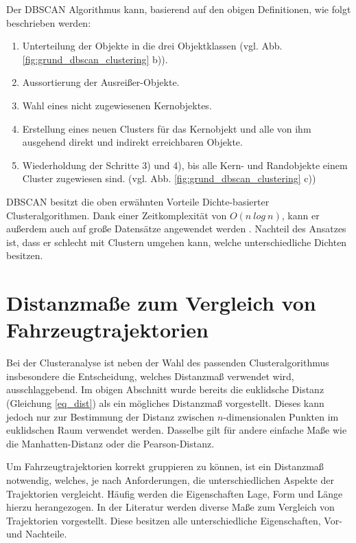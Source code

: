 Der DBSCAN Algorithmus kann, basierend auf den obigen Definitionen, wie folgt beschrieben werden:

\begin{enumerate}
    \item Unterteilung der Objekte in die drei Objektklassen (vgl. Abb. \ref{fig:grund_dbscan_clustering} b)).
    \item Aussortierung der Ausreißer-Objekte.
    \item Wahl eines nicht zugewiesenen Kernobjektes.
    \item Erstellung eines neuen Clusters für das Kernobjekt und alle von ihm ausgehend direkt und indirekt erreichbaren Objekte.
    \item Wiederholdung der Schritte 3) und 4), bis alle Kern- und Randobjekte einem Cluster zugewiesen sind. (vgl. Abb. \ref{fig:grund_dbscan_clustering} c))
\end{enumerate}

DBSCAN besitzt die oben erwähnten Vorteile Dichte-basierter Clusteralgorithmen. Dank einer Zeitkomplexität
von $O(n\ log\ n)$, kann er außerdem auch auf große Datensätze angewendet werden \cite[]{tan2007introduction}.
Nachteil des Ansatzes ist, dass er schlecht mit Clustern umgehen kann, welche unterschiedliche Dichten besitzen.

\section{Distanzmaße zum Vergleich von Fahrzeugtrajektorien}
\label{sec:distance_measures}

Bei der Clusteranalyse ist neben der Wahl des passenden Clusteralgorithmus insbesondere
die Entscheidung, welches Distanzmaß verwendet wird, ausschlaggebend.
Im obigen Abschnitt wurde bereits die euklidsche Distanz (Gleichung \ref{eq_dist}) als ein mögliches Distanzmaß
vorgestellt. Dieses kann jedoch nur zur Bestimmung der Distanz zwischen $n$-dimensionalen Punkten im euklidschen Raum verwendet
werden. Dasselbe gilt für andere einfache Maße wie die Manhatten-Distanz oder die Pearson-Distanz.

Um Fahrzeugtrajektorien korrekt gruppieren zu können, ist ein Distanzmaß notwendig, welches, je nach Anforderungen,
die unterschiedlichen Aspekte der Trajektorien vergleicht. Häufig werden die Eigenschaften Lage, Form und Länge
hierzu herangezogen. In der Literatur werden diverse Maße zum Vergleich von Trajektorien vorgestellt. Diese besitzen
alle unterschiedliche Eigenschaften, Vor- und Nachteile.

